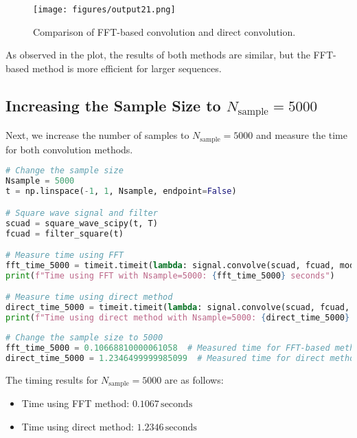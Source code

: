 \documentclass[10pt]{article}
\theoremstyle{definition}
\theoremstyle{remark}
\theoremstyle{definition}
\numberwithin{equation}{prob}
\begin{document}
\begin{figure}[H]
    \centering
    \texttt{[image: figures/output21.png]}  %
    \caption{Comparison of FFT-based convolution and direct convolution.}
\end{figure}

As observed in the plot, the results of both methods are similar, but the FFT-based method is more efficient for larger sequences.

\subsection{Increasing the Sample Size to \(N_{\text{sample}} = 5000\)}

Next, we increase the number of samples to \(N_{\text{sample}} = 5000\) and measure the time for both convolution methods.

\begin{lstlisting}[language=Python]
# Change the sample size
Nsample = 5000
t = np.linspace(-1, 1, Nsample, endpoint=False)

# Square wave signal and filter
scuad = square_wave_scipy(t, T)
fcuad = filter_square(t)

# Measure time using FFT
fft_time_5000 = timeit.timeit(lambda: signal.convolve(scuad, fcuad, mode='same', method='fft'), number=500)
print(f"Time using FFT with Nsample=5000: {fft_time_5000} seconds")

# Measure time using direct method
direct_time_5000 = timeit.timeit(lambda: signal.convolve(scuad, fcuad, mode='same', method='direct'), number=500)
print(f"Time using direct method with Nsample=5000: {direct_time_5000} seconds")
\end{lstlisting}

\begin{lstlisting}[language=Python]
# Change the sample size to 5000
fft_time_5000 = 0.10668810000061058  # Measured time for FFT-based method with Nsample=5000
direct_time_5000 = 1.2346499999985099  # Measured time for direct method with Nsample=5000
\end{lstlisting}

The timing results for \(N_{\text{sample}} = 5000\) are as follows:
\begin{itemize}
    \item Time using FFT method: \(0.1067 \, \text{seconds}\)
    \item Time using direct method: \(1.2346 \, \text{seconds}\)
\end{itemize}
\end{document}
